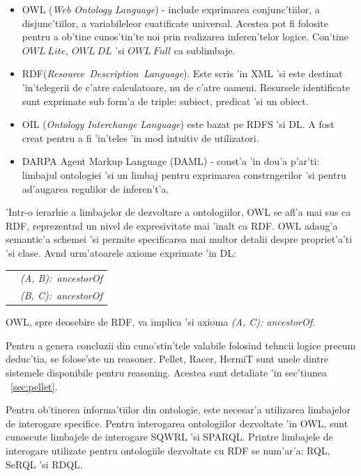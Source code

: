 \documentclass[12pt,a4paper,twoside]{report}
\begin{document}
\begin{itemize}
    \item OWL ({\it Web Ontology Language}) - include exprimarea conjunc'tiilor, a disjunc'tiilor, a variabileleor cuatificate universal. Acestea pot fi folosite pentru a ob'tine cunos'tin'te noi prin realizarea inferen'telor logice. Con'tine $OWL\ Lite$, $OWL\ DL$ 'si $OWL\ Full$ ca sublimbaje.
    \item RDF({\it Resource\ Description\ Language}). Este scris 'in XML 'si este destinat 'in'telegerii de c'atre calculatoare, nu de c'atre oameni. Resursele identificate sunt exprimate sub form'a de triple: subiect, predicat 'si un obiect. 
    \item OIL ({\it Ontology Interchange Language}) este bazat pe RDFS 'si DL. A fost creat pentru a fi 'in'teles 'in mod intuitiv de utilizatori. 
    \item DARPA Agent Markup Language (DAML) - const'a 'in dou'a p'ar'ti: limbajul ontologiei  'si un limbaj pentru exprimarea constr\ia ngerilor 'si pentru ad'augarea regulilor de inferen't'a.
\end{itemize}

'Intr-o ierarhie a limbajelor de dezvoltare a ontologiilor, OWL se afl'a mai sus ca RDF, reprezent\ia nd un nivel de expresivitate mai 'inalt ca RDF. OWL adaug'a semantic'a schemei 'si permite specificarea mai multor detalii despre propriet'a'ti 'si clase. Av\ia nd urm'atoarele axiome exprimate 'in DL:

\begin{tabular}{ll}
          &  {\it (A, B):\ ancestorOf}\\
          &  {\it (B, C):\ ancestorOf}\\
\end{tabular}

OWL, spre deosebire de RDF, va implica 'si axioma {\it (A, C): ancestorOf}. 

Pentru a genera concluzii din cuno'stin'tele valabile folosind tehncii logice precum deduc'tia, se folose'ste un reasoner. Pellet, Racer, HermiT sunt unele dintre sistemele disponibile pentru reasoning. Acestea sunt detaliate 'in sec'tiunea ~\ref{sec:pellet}.

Pentru ob'tinerea informa'tiilor din ontologie, este necesar'a utilizarea limbajelor de interogare specifice. Pentru interogarea ontologiilor dezvoltate 'in OWL, sunt cunoscute limbajele de interogare SQWRL 'si SPARQL. Printre limbajele de interogare utilizate pentru ontologiile dezvoltate cu RDF se num'ar'a: RQL, SeRQL 'si RDQL.
\end{document}

